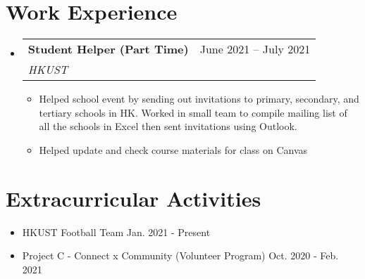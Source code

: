 \documentclass[letterpaper,12pt]{article}
\makeatletter
\newcommand{\resumeItem}[1]{
  \item\small{
    {#1 \vspace{-2pt}}
  }
}
\newcommand{\resumeSubheading}[4]{
  \vspace{-2pt}\item
    \begin{tabular*}{0.97\textwidth}[t]{l@{\extracolsep{\fill}}r}
      \textbf{#1} & #2 \\
      \textit{\small#3} & \textit{\small #4} \\
    \end{tabular*}\vspace{-7pt}
}
\newcommand{\resumeSubHeadingListStart}{\begin{itemize}[leftmargin=0.15in, label={}]}
\newcommand{\resumeSubHeadingListEnd}{\end{itemize}}
\newcommand{\resumeItemListStart}{\begin{itemize}}
\newcommand{\resumeItemListEnd}{\end{itemize}\vspace{-5pt}}
\makeatother
\begin{document}
\section{Work Experience}
  \resumeSubHeadingListStart

    \resumeSubheading
      {Student Helper (Part Time)}{June 2021 -- July 2021}
      {HKUST}{}
      \resumeItemListStart 
        \resumeItem{\normalsize{Helped school event by sending out invitations to primary, secondary, and tertiary schools in HK. Worked in small team to compile mailing list of all the schools in Excel then sent invitations using Outlook.}}
        \resumeItem{\normalsize{Helped update and check course materials for class on Canvas}}
      \resumeItemListEnd

  \resumeSubHeadingListEnd

\section{Extracurricular Activities}
    \begin{itemize}[itemsep=-2pt, parsep=5pt] 
        \item  {HKUST Football Team \hfill Jan. 2021 - Present}
        \item {Project C - Connect x Community (Volunteer Program) \hfill Oct. 2020 - Feb. 2021}
    \end{itemize}
\end{document}
